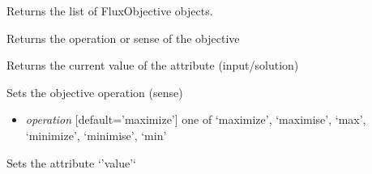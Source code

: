 \documentclass[a4paper,11pt,english]{sphinxmanual}
\begin{document}
\begin{fulllineitems}

\begin{fulllineitems}
\label{modules_doc:cbmpy.CBModel.Objective.getFluxObjectives}
Returns the list of FluxObjective objects.

\end{fulllineitems}


\begin{fulllineitems}
\label{modules_doc:cbmpy.CBModel.Objective.getOperation}
Returns the operation or sense of the objective

\end{fulllineitems}


\begin{fulllineitems}
\label{modules_doc:cbmpy.CBModel.Objective.getValue}
Returns the current value of the attribute (input/solution)

\end{fulllineitems}


\begin{fulllineitems}
\label{modules_doc:cbmpy.CBModel.Objective.setOperation}
Sets the objective operation (sense)
\begin{itemize}
\item {} 
\emph{operation} {[}default='maximize'{]} one of `maximize', `maximise', `max', `minimize', `minimise', `min'

\end{itemize}

\end{fulllineitems}


\begin{fulllineitems}
\label{modules_doc:cbmpy.CBModel.Objective.setValue}
Sets the attribute `'value'`

\end{fulllineitems}


\end{fulllineitems}
\end{document}
